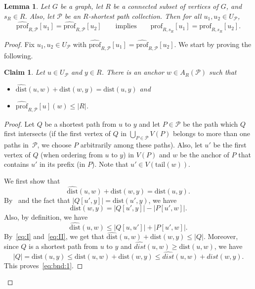 \documentclass[11pt,a4paper]{article}
\newtheorem{lemma}{Lemma}[section]
\newtheorem{claim}{Claim}[section]
\newcommand{\distprofile}[3]{\mathrm{prof}_{#1,#2}[#3]}
\newcommand{\hatprofile}[3]{\widehat{\mathrm{prof}}_{#1,#2}[#3]}
\newcommand{\dist}{\mathrm{dist}}
\renewcommand{\leq}{\leqslant}
\renewcommand{\geq}{\geqslant}
\renewcommand{\le}{\leqslant}
\begin{document}
\begin{lemma}\label{lem:hat-to-normal}
  Let $G$ be a graph, let $R$ be a connected subset of vertices of $G$, and $s_R\in R$. Also, let $\mathcal{P}$ be an $R$-shortest path collection.
  Then for all $u_1,u_2\in U_{\mathcal{P}}$,
  $$\hatprofile{R}{\mathcal{P}}{u_1}=\hatprofile{R}{\mathcal{P}}{u_2}\qquad\textrm{implies}\qquad \distprofile{R}{s_R}{u_1}=\distprofile{R}{s_R}{u_2}.$$
\end{lemma}
\begin{proof}
  Fix $u_1,u_2\in U_{\mathcal{P}}$ with
  $\hatprofile{R}{\mathcal{P}}{u_1}=\hatprofile{R}{\mathcal{P}}{u_2}$.
  We start by proving the following.

  \begin{claim}\label{cl:bnd}
    Let $u\in U_{\mathcal{P}}$ and $y\in R$. There is an anchor $w \in A_R(\mathcal{P})$
    such that
    \begin{itemize}[nosep]
      \item $\widehat{\dist}(u,w)+\dist(w,y) = \dist(u,y)$ and
      \item $\hatprofile{R}{\mathcal{P}}{u}(w)\le |R|$.
    \end{itemize}
  \end{claim}
  \begin{proof}
    Let $Q$ be a shortest path from $u$ to $y$ and let $P\in\mathcal{P}$ be the path which $Q$ first intersects
    (if the first vertex of $Q$ in $\bigcup_{P \in \mathcal{P}} V(P)$ belongs to more than one paths in~$\mathcal{P}$,
    we choose $P$ arbitrarily among these paths). 
    Also, let $u'$ be the first vertex of $Q$ (when ordering from $u$ to $y$) in $V(P)$
    and $w$ be the anchor of $P$ that contains $u'$ in its prefix (in $P$).
    Note that $u' \in V(\mathrm{tail}(w))$.

    We first show that 
    \begin{equation}\label{eq:bnd:1}\widehat{\dist}(u,w)+\dist(w,y)= \dist(u,y).\end{equation}
    By~ and the fact that $|Q[u',y]| = \dist(u',y)$, we have
    \begin{equation}\label{eq:I}
      \dist(w,y) = |Q[u',y]|-|P[u',w]|.
    \end{equation}
    Also, by definition, we have
    \begin{equation}\label{eq:II}
      \widehat{\dist}(u,w)\le |Q[u,u']|+|P[u',w]|.
    \end{equation}
    By~\eqref{eq:I} and~\eqref{eq:II}, we get that $\widehat{\dist}(u,w)+\dist(w,y)\le |Q|$.
    Moreover, since $Q$ is a shortest path from $u$ to $y$ and $\widehat{dist}(u,w) \geq \dist(u,w)$,
    we have
    \[ |Q| = \dist(u,y) \leq \dist(u,w) + \dist(w,y) \leq \widehat{dist}(u,w) + dist(w,y).\]
    This proves~\eqref{eq:bnd:1}.
 

\end{proof}
\end{proof}
\end{document}
